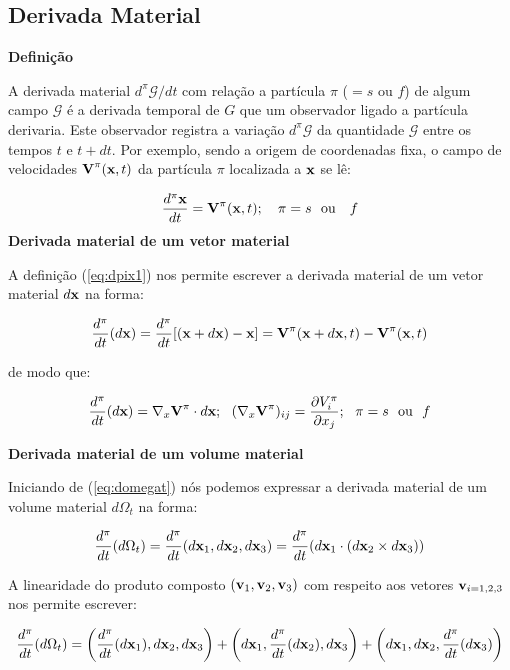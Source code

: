 \documentclass[
	11pt, %
	fleqn, %
	a4paper, %
]{LegrandOrangeBook}
\begin{document}
\subsection{Derivada Material}
\textbf{Definição}

A derivada material $d^\pi \mathcal{G}/dt$ com relação a partícula $\pi$ ($=s$ ou $f$) de algum campo $\mathcal{G}$ é a derivada temporal de $G$ que um observador ligado a partícula derivaria. Este observador registra a variação $d^\pi\mathcal{G}$ da quantidade $\mathcal{G}$ entre os tempos $t$ e $t+dt$. Por exemplo, sendo a origem de coordenadas fixa, o campo de velocidades $\textbf{V}^\pi(\textbf{x},t)$ da partícula $\pi$ localizada a $\textbf{x}$ se lê:

\begin{equation}
	\label{eq:dpix1}	
	\dfrac{d^\pi\textbf{x}}{dt} = \textbf{V}^\pi(\textbf{x},t); ~~~ \pi = s ~~\text{ou} ~~~f
\end{equation}
\textbf{Derivada material de um vetor material}

A definição (\ref{eq:dpix1}) nos permite escrever a derivada material de um vetor material $d\textbf{x}$ na forma:

\begin{equation}
	\label{eq:dpix2}	
	\dfrac{d^\pi}{dt}(d\textbf{x}) = \dfrac{d^\pi}{dt}[(\textbf{x}+d\textbf{x})-\textbf{x}]=\textbf{V}^\pi(\textbf{x}+d\textbf{x},t)- \textbf{V}^\pi(\textbf{x},t) 
\end{equation}

de modo que:

\begin{equation}
	\label{eq:dpix3}	
	\dfrac{d^\pi}{dt}(d\textbf{x}) = \nabla_x\textbf{V}^\pi \cdot d\textbf{x}; ~~ (\nabla_x \textbf{V}^\pi)_{ij} = \dfrac{\partial V_i^\pi}{\partial x_j}; ~~ \pi = s ~~ \text{ou} ~~ f
\end{equation}

\textbf{Derivada material de um volume material}

Iniciando de (\ref{eq:domegat}) nós podemos expressar a derivada material de um volume material $d\Omega_t$ na forma:

\begin{equation}
	\label{eq:derivadavolumematerial}	
	\dfrac{d^\pi}{dt}(d\Omega_t) = \dfrac{d^\pi}{dt}(d\textbf{x}_1,d\textbf{x}_2,d\textbf{x}_3) = \dfrac{d^\pi}{dt}(d\textbf{x}_1\cdot (d\textbf{x}_2 \times d\textbf{x}_3))
\end{equation}

A linearidade do produto composto $(\textbf{v}_1, \textbf{v}_2, \textbf{v}_3)$ com respeito aos vetores $\textbf{v}_{i=1,2,3}$ nos permite escrever: 

\begin{equation}
	\label{eq:derivadavolumematerial1}	
	\dfrac{d^\pi}{dt}(d\Omega_t) = \left(\dfrac{d^\pi}{dt}(d\textbf{x}_1),d\textbf{x}_2,d\textbf{x}_3\right) + \left(d\textbf{x}_1,\dfrac{d^\pi}{dt}(d\textbf{x}_2),d\textbf{x}_3\right)+\left(d\textbf{x}_1,d\textbf{x}_2,\dfrac{d^\pi}{dt}(d\textbf{x}_3)\right)
\end{equation}
\end{document}
